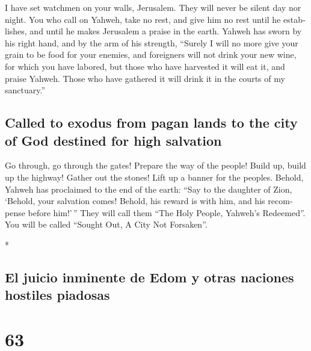 \begin{paracol}{2}
\begin{otherlanguage}{english}
 I have set watchmen on your walls, Jerusalem. They will
never be silent day nor night. You who call on Yahweh, take no rest,
 and give him no rest until he establishes, and until he
makes Jerusalem a praise in the earth.  Yahweh has sworn
by his right hand, and by the arm of his strength, ``Surely I will no
more give your grain to be food for your enemies, and foreigners will
not drink your new wine, for which you have labored,  but
those who have harvested it will eat it, and praise Yahweh. Those who
have gathered it will drink it in the courts of my sanctuary.''

\hypertarget{called-to-exodus-from-pagan-lands-to-the-city-of-god-destined-for-high-salvation}{%
\subsection{Called to exodus from pagan lands to the city of God
destined for high
salvation}\label{called-to-exodus-from-pagan-lands-to-the-city-of-god-destined-for-high-salvation}}

 Go through, go through the gates! Prepare the way of the
people! Build up, build up the highway! Gather out the stones! Lift up a
banner for the peoples.  Behold, Yahweh has proclaimed to
the end of the earth: ``Say to the daughter of Zion, `Behold, your
salvation comes! Behold, his reward is with him, and his recompense
before him!'\,''  They will call them ``The Holy People,
Yahweh's Redeemed''. You will be called ``Sought Out, A City Not
Forsaken''.

\end{otherlanguage}

\switchcolumn[0]*

\hypertarget{el-juicio-inminente-de-edom-y-otras-naciones-hostiles-piadosas}{%
\subsection{El juicio inminente de Edom y otras naciones hostiles
piadosas}\label{el-juicio-inminente-de-edom-y-otras-naciones-hostiles-piadosas}}

\hypertarget{section-124}{%
\section{63}\label{section-124}}


\end{paracol}

